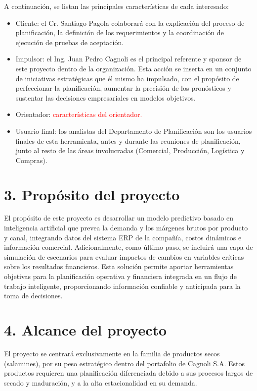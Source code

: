 \documentclass[
11pt, %
]{charter}
\begin{document}
A continuación, se listan las principales características de cada interesado:
\begin{itemize}
	\item Cliente: el Cr. Santiago Pagola colaborará con la explicación del proceso de planificación, la definición de los requerimientos y la coordinación de ejecución de pruebas de aceptación.
	\item Impulsor: el Ing. Juan Pedro Cagnoli es el principal referente y sponsor de este proyecto dentro de la organización. Esta acción se inserta en un conjunto de iniciativas estratégicas que él mismo ha impulsado, con el propósito de perfeccionar la planificación, aumentar la precisión de los pronósticos y sustentar las decisiones empresariales en modelos objetivos.
	\item Orientador: \textcolor{red}{características del orientador.}
	\item Usuario final: los analistas del Departamento de Planificación son los usuarios finales de esta herramienta, antes y durante las reuniones de planificación, junto al resto de las áreas involucradas (Comercial, Producción, Logística y Compras).
\end{itemize}


\section{3. Propósito del proyecto}
\label{sec:proposito}

El propósito de este proyecto es desarrollar un modelo predictivo basado en inteligencia artificial que prevea la demanda y los márgenes brutos por producto y canal, integrando datos del sistema ERP de la compañía, costos dinámicos e información comercial. Adicionalmente, como último paso, se incluirá una capa de simulación de escenarios para evaluar impactos de cambios en variables críticas sobre los resultados financieros. Esta solución permite aportar herramientas objetivas para la planificación operativa y financiera integrada en un flujo de trabajo inteligente, proporcionando información confiable y anticipada para la toma de decisiones.


\section{4. Alcance del proyecto}
\label{sec:alcance}

El proyecto se centrará exclusivamente en la familia de productos secos (salamines), por su peso estratégico dentro del portafolio de Cagnoli S.A. Estos productos requieren una planificación diferenciada debido a sus procesos largos de secado y maduración, y a la alta estacionalidad en su demanda.
\end{document}
